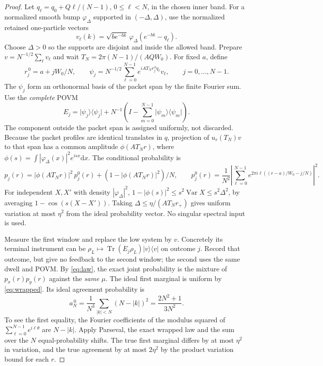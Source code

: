 \documentclass[11pt]{article}
\theoremstyle{remark}
\newcommand{\tr}{\operatorname{Tr}}
\newcommand{\dd}{\mathrm{d}}
\newcommand{\proj}[1]{\lvert #1\rangle\!\langle #1\rvert}
\begin{document}
\begin{proof}
Let \(q_\ell=q_0+Q\ell/(N-1)\), \(0\le\ell<N\), in the chosen
inner band. For a normalized smooth bump \(\varphi_\Delta\) supported
in \((-\Delta,\Delta)\), use the normalized retained one-particle
vectors
\[
 v_\ell(k)=\sqrt{be^{-bk}}\,
                 \varphi_\Delta(e^{-bk}-q_\ell).
\]
Choose \(\Delta>0\) so the supports are disjoint and inside the
allowed band. Prepare \(v=N^{-1/2}\sum_\ell v_\ell\) and wait
\(T_N=2\pi(N-1)/(AQW_0)\). For fixed \(a\), define
\[
 r_j^{\,0}=a+j W_0/N,\qquad
 \psi_j=N^{-1/2}\sum_{\ell=0}^{N-1}
                    e^{iAT_Nr_j^{\,0}q_\ell}v_\ell ,
 \qquad j=0,\ldots,N-1 .
\]
The \(\psi_j\) form an orthonormal basis of the packet span
by the finite Fourier sum. Use the \emph{complete} POVM
\[
 E_j=\proj{\psi_j}+
        N^{-1}\left(I-\sum_{m=0}^{N-1}\proj{\psi_m}\right).
\]
The component outside the packet span is assigned uniformly, not
discarded. Because the packet profiles are identical translates in
\(q\), projection of \(u_r(T_N)v\) to that span has a common amplitude
\(\phi(AT_Nr)\), where
\(\phi(s)=\int|\varphi_\Delta(x)|^2 e^{isx}\dd x\).
The conditional probability is
\[
 p_j(r)=|\phi(AT_Nr)|^2\,p_j^0(r)
           +(1-|\phi(AT_Nr)|^2)/N,\qquad
 p_j^0(r)=\frac1{N^2}\left|\sum_{\ell=0}^{N-1}
   e^{2\pi i\ell((r-a)/W_0-j/N)}\right|^2 .
\]
For independent \(X,X'\) with density \(|\varphi_\Delta|^2\),
\(1-|\phi(s)|^2\le s^2\operatorname{Var}X\le s^2\Delta^2\),
by averaging \(1-\cos(s(X-X'))\). Taking
\(\Delta\le\eta/(AT_Nr_+)\) gives uniform variation at most
\(\eta^2\) from the ideal probability vector. No singular
spectral input is used.

Measure the first window and replace the low system by \(v\).
Concretely its terminal instrument can be
\(\rho_L\mapsto\tr(E_j\rho_L)\proj v\) on outcome \(j\).
Record that outcome, but give no feedback to the second window;
the second uses the same dwell and POVM. By \eqref{eq:law},
the exact joint probability is the mixture of \(p_x(r)p_y(r)\)
against the \emph{same} \(\mu\). The ideal first marginal is
uniform by \eqref{eq:wrapped}. Its ideal agreement probability is
\[
 a_N^{\,0}=\frac1{N^3}\sum_{|k|< N}(N-|k|)^2
          =\frac{2N^2+1}{3N^2}.
\]
To see the first equality, the Fourier coefficients of the modulus
squared of \(\sum_{\ell=0}^{N-1}e^{i\ell\theta}\) are \(N-|k|\).
Apply Parseval, the exact wrapped law and the sum over the \(N\)
equal-probability shifts. The true first marginal differs by at
most \(\eta^2\) in variation, and the true agreement by at most
\(2\eta^2\) by the product variation bound for each \(r\).


\end{proof}
\end{document}
